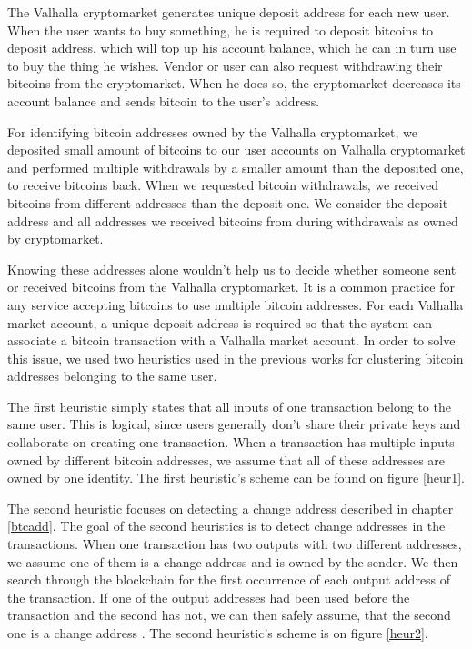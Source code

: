 \documentclass[
  digital, %
  table,   %
  lof,     %
  lot,     %
  oneside
]{fithesis3}
\begin{document}
The Valhalla cryptomarket generates unique deposit address for each new user.
When the user wants to buy something, he is required to deposit bitcoins to deposit address,
which will top up his account balance, which he can in turn use to buy the thing he wishes.
Vendor or user can also request withdrawing their bitcoins from the cryptomarket. When he does so,
the cryptomarket decreases its account balance and sends bitcoin to the user's address.

For identifying bitcoin addresses owned by the Valhalla cryptomarket, we 
deposited small amount of bitcoins to our user accounts on Valhalla cryptomarket and
performed multiple withdrawals by a smaller amount than the deposited one, to receive bitcoins back.
When we requested bitcoin withdrawals, we received bitcoins from different addresses
than the deposit one. We consider the deposit address and all addresses we received
bitcoins from during withdrawals as owned by cryptomarket.

Knowing these addresses alone wouldn't help us to decide
whether someone sent or received bitcoins from the Valhalla cryptomarket.
It is a common practice for any service accepting bitcoins to
use multiple bitcoin addresses.
For each Valhalla market account,
a unique deposit address is required so that the system can associate
a bitcoin transaction with a Valhalla market account.
In order to solve this issue, we used two heuristics used
in the previous works \parencite{androulaki2013evaluating}\parencite{reid2013analysis}
for clustering bitcoin addresses belonging to the same user.

The first heuristic simply states that all inputs of one transaction belong to the same user. This is logical,
since users generally don't share their private keys and collaborate on creating one transaction.
When a transaction has multiple inputs owned by different bitcoin addresses, we assume that all of these addresses are owned by
one identity. The first heuristic's scheme can be found on figure \ref{heur1}.

The second heuristic focuses on detecting a change address described in chapter \ref{btcadd}.
The goal of the second heuristics is to detect change addresses in the transactions.
When one transaction has two outputs with two different addresses, we assume one of them is a change
address and is owned by the sender.
We then search through the blockchain for the first occurrence of each output address of the transaction. If one of the output addresses had been used before the transaction and the second has not,
we can then safely assume, that the second one is a change address \parencite{androulaki2013evaluating}.
The second heuristic's scheme is on figure \ref{heur2}.
\end{document}
